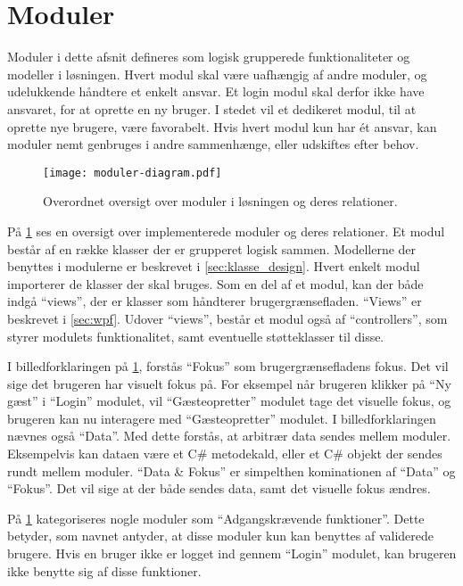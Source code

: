 \section{Moduler}
\label{sec:moduler}

Moduler i dette afsnit defineres som logisk grupperede funktionaliteter og modeller i løsningen. Hvert modul skal være uafhængig af andre moduler, og udelukkende håndtere et enkelt ansvar. Et login modul skal derfor ikke have ansvaret, for at oprette en ny bruger. I stedet vil et dedikeret modul, til at oprette nye brugere, være favorabelt. Hvis hvert modul kun har ét ansvar, kan moduler nemt genbruges i andre sammenhænge, eller udskiftes efter behov.

\begin{figure}
  \centering
  \texttt{[image: moduler-diagram.pdf]}
  \caption{Overordnet oversigt over moduler i løsningen og deres relationer.}
  \label{fig:mod}
\end{figure}

På \cref{fig:mod} ses en oversigt over implementerede moduler og deres relationer. Et modul består af en række klasser der er grupperet logisk sammen. Modellerne der benyttes i modulerne er beskrevet i \cref{sec:klasse_design}. Hvert enkelt modul importerer de klasser der skal bruges. Som en del af et modul, kan der både indgå \enquote{views}, der er klasser som håndterer brugergrænsefladen. \enquote{Views} er beskrevet i \cref{sec:wpf}. Udover \enquote{views}, består et modul også af \enquote{controllers}, som styrer modulets funktionalitet, samt eventuelle støtteklasser til disse.

I billedforklaringen på  \cref{fig:mod}, forstås \enquote{Fokus} som brugergrænsefladens fokus. Det vil sige det brugeren har visuelt fokus på. For eksempel når brugeren klikker på \enquote{Ny gæst} i \enquote{Login} modulet, vil \enquote{Gæsteopretter} modulet tage det visuelle fokus, og brugeren kan nu interagere med \enquote{Gæsteopretter} modulet. I billedforklaringen nævnes også \enquote{Data}. Med dette forstås, at arbitrær data sendes mellem moduler. Eksempelvis kan dataen være et C\# metodekald, eller et C\# objekt der sendes rundt mellem moduler. \enquote{Data \& Fokus} er simpelthen kominationen af \enquote{Data} og \enquote{Fokus}. Det vil sige at der både sendes data, samt det visuelle fokus ændres.

På \cref{fig:mod} kategoriseres nogle moduler som \enquote{Adgangskrævende funktioner}. Dette betyder, som navnet antyder, at disse moduler kun kan benyttes af validerede brugere. Hvis en bruger ikke er logget ind gennem \enquote{Login} modulet, kan brugeren ikke benytte sig af disse funktioner.

